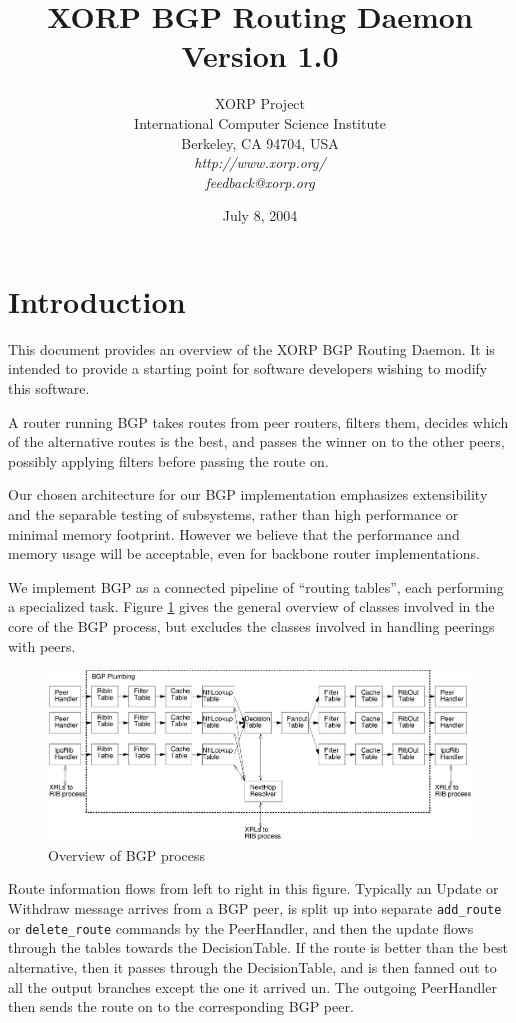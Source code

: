 \documentclass[11pt]{article}
\title{XORP BGP Routing Daemon \\
\vspace{1ex}
Version 1.0}
\author{ XORP Project					\\
	 International Computer Science Institute	\\
	 Berkeley, CA 94704, USA			\\
         {\it http://www.xorp.org/}			\\
	 {\it feedback@xorp.org}
}
\date{July 8, 2004}
\begin{document}
\maketitle                            
\section{Introduction}
This document provides an overview of the XORP BGP Routing Daemon.  It
is intended to provide a starting point for software developers
wishing to modify this software.

A router running BGP takes routes from peer routers, filters them,
decides which of the alternative routes is the best, and passes the
winner on to the other peers, possibly applying filters before passing
the route on.

Our chosen architecture for our BGP implementation emphasizes
extensibility and the separable testing of subsystems, rather than
high performance or minimal memory footprint.  However we believe that
the performance and memory usage will be acceptable, even for backbone
router implementations.

We implement BGP as a connected pipeline of ``routing tables'', each
performing a specialized task.  Figure \ref{overview} gives the
general overview of classes involved in the core of the BGP process,
but excludes the classes involved in handling peerings with peers.
\begin{figure}[htb]
\centerline{\includegraphics[width=1.0\textwidth]{figs/overview}}
\vspace{.05in}
\caption{\label{overview}Overview of BGP process}
\end{figure}
Route information flows from left to right in this figure.  Typically
an Update or Withdraw message arrives from a BGP peer, is split up
into separate {\tt add\_route} or {\tt delete\_route} commands by the PeerHandler,
and then the update flows through the tables towards the
DecisionTable.  If the route is better than the best alternative, then
it passes through the DecisionTable, and is then fanned out to all the
output branches except the one it arrived un.  The outgoing
PeerHandler then sends the route on to the corresponding BGP peer.
\end{document}
